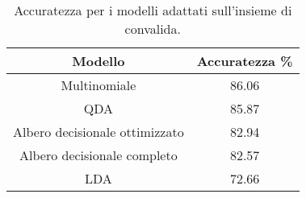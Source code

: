 \begin{table}[H]
\centering
\caption{Accuratezza per i modelli adattati sull'insieme di convalida.}
\begin{tabular}{cc}
\toprule
                        Modello &  Accuratezza \% \\
\midrule
                   Multinomiale &          86.06 \\
                            QDA &          85.87 \\
 Albero decisionale ottimizzato &          82.94 \\
    Albero decisionale completo &          82.57 \\
                            LDA &          72.66 \\
\bottomrule
\end{tabular}
\label{tab:acc}
\end{table}
